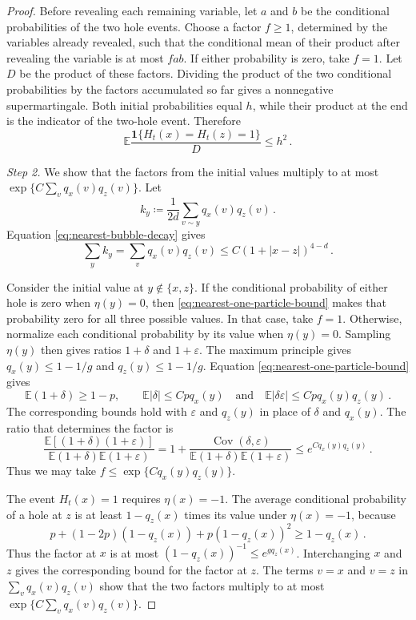 \documentclass[11pt]{amsart}
\theoremstyle{plain}
\theoremstyle{definition}
\newcommand{\E}{\mathbb{E}}
\DeclareMathOperator{\Cov}{Cov}
\newcommand{\one}{\mathbf{1}}
\newcommand{\eps}{\varepsilon}
\begin{document}
\begin{proof}
	Before revealing each remaining variable, let $a$ and $b$ be the conditional
	probabilities of the two hole events. Choose a factor $f\geq1$, determined by
	the variables already revealed, such that the conditional mean of their
	product after revealing the variable is at most $fab$. If either probability
	is zero, take $f=1$. Let $D$ be the product of these factors. Dividing
	the product of the two conditional probabilities by the factors accumulated so
	far gives a nonnegative supermartingale. Both initial probabilities equal
	$h$, while their product at the end is the indicator of the two-hole event.
	Therefore
	\begin{equation}\label{eq:nearest-factor-supermartingale}
		\E\frac{\one\{H_t(x)=H_t(z)=1\}}{D}\leq h^2\,.
	\end{equation}

	\smallskip
	\noindent\emph{Step 2.} We show that the factors from the initial values
	multiply to at most $\exp\{C\sum_vq_x(v)q_z(v)\}$. Let
	\[
		k_y\coloneqq\frac1{2d}\sum_{v\sim y}q_x(v)q_z(v)\,.
	\]
	Equation \eqref{eq:nearest-bubble-decay} gives
	\begin{equation}\label{eq:nearest-kernel-sum}
		\sum_yk_y=\sum_vq_x(v)q_z(v)
		\leq C(1+|x-z|)^{4-d}\,.
	\end{equation}

	Consider the initial value at $y\notin\{x,z\}$. If the conditional
	probability of either hole is zero when $\eta(y)=0$, then
	\eqref{eq:nearest-one-particle-bound} makes that probability zero for all
	three possible values. In that case, take $f=1$. Otherwise, normalize each
	conditional probability by its value when $\eta(y)=0$. Sampling $\eta(y)$
	then gives ratios $1+\delta$ and $1+\eps$. The maximum principle gives
	$q_x(y)\leq1-1/g$ and $q_z(y)\leq1-1/g$.
	Equation \eqref{eq:nearest-one-particle-bound} gives
	\[
		\E(1+\delta)\geq1-p,\qquad
		\E|\delta|\leq Cpq_x(y)
		\quad\text{and}\quad
		\E|\delta\eps|\leq Cpq_x(y)q_z(y)\,.
	\]
	The corresponding bounds hold with $\eps$ and $q_z(y)$ in place of
	$\delta$ and $q_x(y)$.
	The ratio that determines the factor is
	\[
		\frac{\E[(1+\delta)(1+\eps)]}
		{\E(1+\delta)\E(1+\eps)}
		=1+\frac{\Cov(\delta,\eps)}
		{\E(1+\delta)\E(1+\eps)}
		\leq e^{Cq_x(y)q_z(y)}\,.
	\]
	Thus we may take $f\leq\exp\{Cq_x(y)q_z(y)\}$.

	The event $H_t(x)=1$ requires $\eta(x)=-1$. The average conditional
	probability of a hole at $z$ is at least $1-q_z(x)$ times its value under
	$\eta(x)=-1$, because
	\[
		p+(1-2p)(1-q_z(x))+p(1-q_z(x))^2\geq1-q_z(x)\,.
	\]
	Thus the factor at $x$ is at most
	$(1-q_z(x))^{-1}\leq e^{gq_z(x)}$. Interchanging $x$ and $z$ gives the
	corresponding bound for the factor at $z$. The
	terms $v=x$ and $v=z$ in $\sum_vq_x(v)q_z(v)$ show that the two factors
	multiply to at most $\exp\{C\sum_vq_x(v)q_z(v)\}$.


\end{proof}
\end{document}

